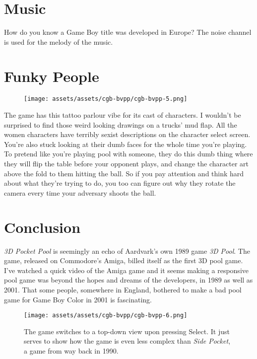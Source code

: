 \documentclass{book}
\begin{document}
\FloatBarrier\needspace{10mm}\section*{Music}\nopagebreak[4]

How do you know a Game Boy title was developed in Europe? The noise channel is used for the melody of the music.

\FloatBarrier\needspace{10mm}\section*{Funky People}\nopagebreak[4]

\begin{figure}[hbt]
\vskip 10pt
\centering \texttt{[image: assets/assets/cgb-bvpp/cgb-bvpp-5.png]}
\vskip 6pt
\end{figure}
The game has this tattoo parlour vibe for its cast of characters. I wouldn’t be surprised to find those weird looking drawings on a trucks’ mud flap. All the women characters have terribly sexist descriptions on the character select screen. You’re also stuck looking at their dumb faces for the whole time you’re playing. To pretend like you’re playing pool with someone, they do this dumb thing where they will flip the table before your opponent plays, and change the character art above the fold to them hitting the ball. So if you pay attention and think hard about what they’re trying to do, you too can figure out why they rotate the camera every time your adversary shoots the ball.

\FloatBarrier\needspace{10mm}\section*{Conclusion}\nopagebreak[4]

\emph{3D Pocket Pool} is seemingly an echo of Aardvark’s own 1989 game \emph{3D Pool}. The game, released on Commodore’s Amiga, billed itself as the first 3D pool game. I’ve watched a quick video of the Amiga game and it seems making a responsive pool game was beyond the hopes and dreams of the developers, in 1989 as well as 2001. That some people, somewhere in England, bothered to make a bad pool game for Game Boy Color in 2001 is fascinating.

\begin{figure}[hbt]
\vskip 10pt
\centering \texttt{[image: assets/assets/cgb-bvpp/cgb-bvpp-6.png]}\par\pagetwodescription The game switches to a top-down view upon pressing Select. It just serves to show how the game is even less complex than \emph{Side Pocket}, a game from way back in 1990.
\vskip 6pt
\end{figure}
\end{document}
